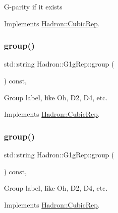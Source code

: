 G-\/parity if it exists 

Implements \mbox{\hyperlink{structHadron_1_1CubicRep_a52104e43266d1614c00bbd1c3b395458}{Hadron\+::\+Cubic\+Rep}}.

\mbox{\label{structHadron_1_1G1gRep_a9cac45eca83a4b934646e99a068bec72}} 
\subsubsection{\texorpdfstring{group()}{group()}\hspace{0.1cm}{\footnotesize\ttfamily [1/2]}}
{\footnotesize\ttfamily std\+::string Hadron\+::\+G1g\+Rep\+::group (\begin{DoxyParamCaption}{ }\end{DoxyParamCaption}) const\hspace{0.3cm}{\ttfamily [inline]}, {\ttfamily [virtual]}}

Group label, like Oh, D2, D4, etc. 

Implements \mbox{\hyperlink{structHadron_1_1CubicRep_a0748f11ec87f387062c8e8981339a29c}{Hadron\+::\+Cubic\+Rep}}.

\mbox{\label{structHadron_1_1G1gRep_a9cac45eca83a4b934646e99a068bec72}} 
\subsubsection{\texorpdfstring{group()}{group()}\hspace{0.1cm}{\footnotesize\ttfamily [2/2]}}
{\footnotesize\ttfamily std\+::string Hadron\+::\+G1g\+Rep\+::group (\begin{DoxyParamCaption}{ }\end{DoxyParamCaption}) const\hspace{0.3cm}{\ttfamily [inline]}, {\ttfamily [virtual]}}

Group label, like Oh, D2, D4, etc. 

Implements \mbox{\hyperlink{structHadron_1_1CubicRep_a0748f11ec87f387062c8e8981339a29c}{Hadron\+::\+Cubic\+Rep}}.

\mbox{\label{structHadron_1_1G1gRep_ad61e2bd6d4def56365662d7108262ffb}} 
